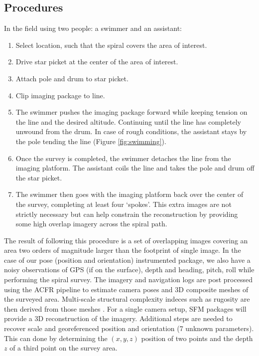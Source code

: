\subsection{Procedures}

In the field using two people: a swimmer and an assistant:\begin{enumerate}
\item Select location, such that the spiral covers the area of interest.
\item Drive star picket at the center of the area of interest. 
\item Attach pole and drum to star picket.
\item Clip imaging package to line.
\item The swimmer pushes the imaging package forward while keeping tension on the line and the desired altitude. Continuing until the line has completely unwound from the drum. In case of rough conditions, the assistant stays by the pole tending the line (Figure \ref{fig:swimming}).
\item Once the survey is completed, the swimmer detaches the line from the imaging platform. The assistant coils the line and takes the pole and drum off the star picket. 
\item The swimmer then goes with the imaging platform back over the center of the survey, completing at least four `spokes'. This extra images are not strictly necessary but can help constrain the reconstruction by providing some high overlap imagery across the spiral path.
\end{enumerate}

The result of following this procedure is a set of overlapping images covering an area two orders of magnitude larger than the footprint of single image. In the case of our pose (position and orientation) instrumented package, we also have a noisy observations of GPS (if on the surface), depth and heading, pitch, roll while performing the spiral survey. The imagery and navigation logs are post processed using the ACFR pipeline \cite{Johnson_Roberson_2010} \cite{Mahon_2008} \cite{Johnson_Roberson_2013} to estimate camera poses and 3D composite meshes of the surveyed area. Multi-scale structural complexity indeces such as rugosity are then derived from those meshes \cite{Friedman_2012}.
For a single camera setup, SFM packages will provide a 3D reconstruction of the imagery. Additional steps are needed to recover scale and georeferenced position and orientation (7 unknown parameters). This can done by determining the $(x,y,z)$ position of two points and the depth $z$ of a third point on the survey area.
